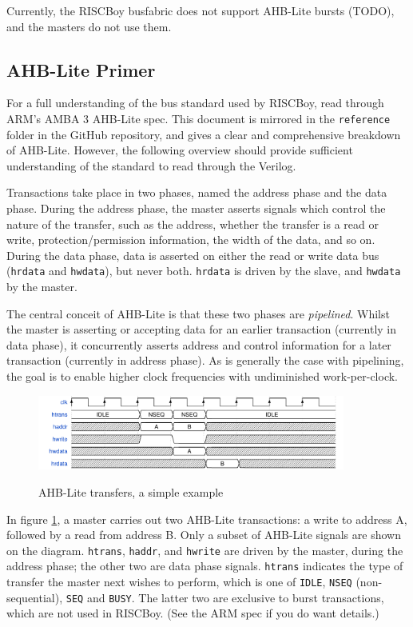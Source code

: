 Currently, the RISCBoy busfabric does not support AHB-Lite bursts (TODO), and the masters do not use them.

\subsection{AHB-Lite Primer}

For a full understanding of the bus standard used by RISCBoy, read through ARM's AMBA 3 AHB-Lite spec. This document is mirrored in the {\tt reference} folder in the GitHub repository, and gives a clear and comprehensive breakdown of AHB-Lite. However, the following overview should provide sufficient understanding of the standard to read through the Verilog.

Transactions take place in two phases, named the address phase and the data phase. During the address phase, the master asserts signals which control the nature of the transfer, such as the address, whether the transfer is a read or write, protection/permission information, the width of the data, and so on. During the data phase, data is asserted on either the read or write data bus ({\tt hrdata} and {\tt hwdata}), but never both. {\tt hrdata} is driven by the slave, and {\tt hwdata} by the master.

The central conceit of AHB-Lite is that these two phases are {\it pipelined}. Whilst the master is asserting or accepting data for an earlier transaction (currently in data phase), it concurrently asserts address and control information for a later transaction (currently in address phase). As is generally the case with pipelining, the goal is to enable higher clock frequencies with undiminished work-per-clock.

\begin{figure}[H]
\centering
\caption{AHB-Lite transfers, a simple example}
\includegraphics[width=0.9\textwidth]{waves/ahbl_basic.pdf}
\label{diagram:ahbl_basic}
\end{figure}

In figure \ref{diagram:ahbl_basic}, a master carries out two AHB-Lite transactions: a write to address A, followed by a read from address B. Only a subset of AHB-Lite signals are shown on the diagram. {\tt htrans}, {\tt haddr}, and {\tt hwrite} are driven by the master, during the address phase; the other two are data phase signals. {\tt htrans} indicates the type of transfer the master next wishes to perform, which is one of {\tt IDLE}, {\tt NSEQ} (non-sequential), {\tt SEQ} and {\tt BUSY}. The latter two are exclusive to burst transactions, which are not used in RISCBoy. (See the ARM spec if you do want details.)

